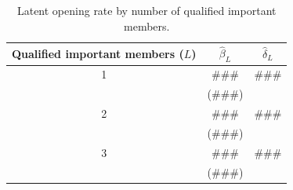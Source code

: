 \begin{table}[t]
  \centering
  \caption{Latent opening rate by number of qualified important members.}
  \label{tab:mean_reversion}
\begin{tabular}{ccc}
\toprule
\shortstack{Qualified important\\members ($L$)} & $\hat{\beta}_L$ & $\hat{\delta}_L$ \\
\midrule
1 & ### & ### \\
  & (###) & \\
2 & ### & ### \\
  & (###) & \\
3 & ### & ### \\
  & (###) & \\
\bottomrule
\end{tabular}
\end{table}
